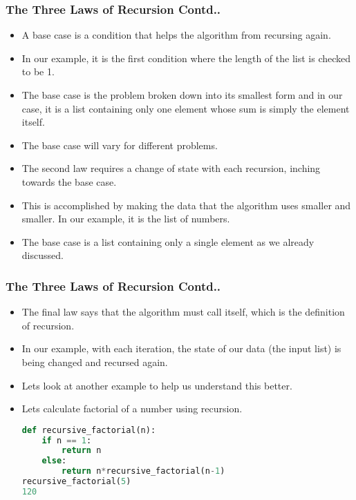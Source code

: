 \documentclass{beamer}
\begin{document}
\begin{frame}
\frametitle{The Three Laws of Recursion Contd..}
\begin{itemize}
\item A base case is a condition that helps the algorithm from recursing again.
\item In our example, it is the first condition where the length of the list is checked to be 1.
\item The base case is the problem broken down into its smallest form and in our case, it is a list containing only one element whose sum is simply the element itself.
\item The base case will vary for different problems.
\item The second law requires a change of state with each recursion, inching towards the base case.
\item This is accomplished by making the data that the algorithm uses smaller and smaller. In our example, it is the list of numbers.
\item The base case is a list containing only a single element as we already discussed.
\end{itemize}
\end{frame}

\begin{frame}[fragile]
\frametitle{The Three Laws of Recursion Contd..}
\begin{itemize}
\item The final law says that the algorithm must call itself, which is the definition of recursion.
\item In our example, with each iteration, the state of our data (the input list) is being changed and recursed again.
\item Lets look at another example to help us understand this better.
\item Lets calculate factorial of a number using recursion.
\begin{lstlisting}[language=Python]
def recursive_factorial(n):
    if n == 1:
        return n
    else:
        return n*recursive_factorial(n-1)
recursive_factorial(5)
120
\end{lstlisting}
\end{itemize}
\end{frame}
\end{document}
